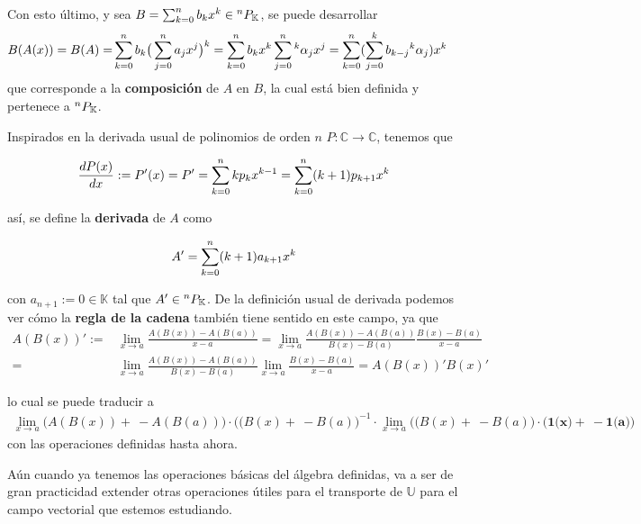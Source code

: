 Con esto último, y sea $B = \sum_{k=0}^n b_k x^k \in {^{n}P_{\mathbb{K}}}$, se puede desarrollar
\begin{align*}
 B(A(x)) = B(A) =& \sum_{k=0}^n b_k \big( \sum_{j=0}^n a_j x^j  \big)^k = \sum_{k=0}^n b_k x^k \sum_{j=0}^n {^k\alpha_j x^j} =\sum_{k=0}^n  (\sum_{j=0}^k b_{k-j} {^k\alpha_j}  )  x^k
 \end{align*}
que corresponde a la \textbf{composición} de $A$ en $B$, la cual está bien definida y pertenece a ${^{n}P_{\mathbb{K}}}$.

Inspirados en la derivada usual de polinomios de orden $n$ $P: \mathbb{C} \to \mathbb{C}$, tenemos que

\begin{align*}
 \frac{dP(x)}{dx} := P'(x) = P' = \sum_{k=0}^n{k p_k x^{k-1}} = \sum_{k=0}^n (k+1)p_{k+1} x^k 
\end{align*}

así, se define la \textbf{derivada} de $A$ como

\begin{align}
 A' = \sum_{k=0}^n (k+1)a_{k+1} x^k
 \label{eq:polderiv}
\end{align}

con $a_{n+1} := 0 \in \mathbb{K}$ tal que $A' \in {^{n}P_{\mathbb{K}}}$. De la definición usual de derivada podemos ver cómo la \textbf{regla de la cadena} también tiene sentido en este campo, ya que 
\begin{align*}
 { A(B(x))}' :=& \lim_{x \to a}\frac{A(B(x)) - A(B(a))}{x-a} = \lim_{x \to a} \frac{A(B(x)) - A(B(a))}{B(x)-B(a)}\frac{B(x) - B(a)}{x-a}  \\
 =& \lim_{x \to a} \frac{A(B(x)) - A(B(a))}{B(x)-B(a)} \lim_{x \to a} \frac{B(x) - B(a)}{x-a} = A(B(x))'B(x)'
\end{align*}

lo cual se puede traducir a 
\begin{align*}
\lim_{x \to a} \big( A(B(x)) + \ - A(B(a)) \big) \cdot \big( (B(x) + \ -B(a) \big)^{-1} \cdot \lim_{x \to a} \big( (B(x) + \ -B(a) \big) \cdot \big( \textbf{1(x)} + \ -\textbf{1(a)} \big)    
\end{align*}
con las operaciones definidas hasta ahora.


Aún cuando ya tenemos las operaciones básicas del álgebra definidas, va a ser de gran practicidad extender otras operaciones útiles para el transporte de $\mathbb{U}$ para el campo vectorial que estemos estudiando.

